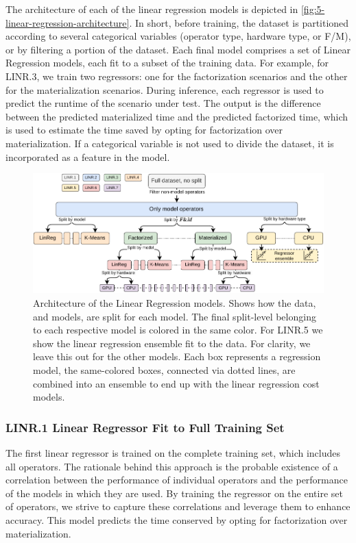 The architecture of each of the linear regression models is depicted in \autoref{fig:5-linear-regression-architecture}. In short, before training, the dataset is partitioned according to several categorical variables (operator type, hardware type, or F/M), or by filtering a portion of the dataset. Each final model comprises a set of Linear Regression models, each fit to a subset of the training data. For example, for LINR.3, we train two regressors: one for the factorization scenarios and the other for the materialization scenarios. During inference, each regressor is used to predict the runtime of the scenario under test. The output is the difference between the predicted materialized time and the predicted factorized time, which is used to estimate the time saved by opting for factorization over materialization. If a categorical variable is not used to divide the dataset, it is incorporated as a feature in the model.

\begin{figure}[ht]
  \centering
  \includegraphics[width=\linewidth]{chapters/05_cost_estimation/figures/statistical-architecture.pdf}
  \caption[Linear Regression model Architecture]{Architecture of the Linear Regression models. Shows how the data, and models, are split for each model. The final split-level belonging to each respective model is colored in the same color. For LINR.5 we show the linear regression ensemble fit to the data. For clarity, we leave this out for the other models. Each box represents a regression model, the same-colored boxes, connected via dotted lines, are combined into an ensemble to end up with the linear regression cost models.}
  \label{fig:5-linear-regression-architecture}
\end{figure}

\subsubsection*{LINR.1 Linear Regressor Fit to Full Training Set}
The first linear regressor is trained on the complete training set, which includes all operators. The rationale behind this approach is the probable existence of a correlation between the performance of individual operators and the performance of the models in which they are used. By training the regressor on the entire set of operators, we strive to capture these correlations and leverage them to enhance accuracy. This model predicts the time conserved by opting for factorization over materialization.

